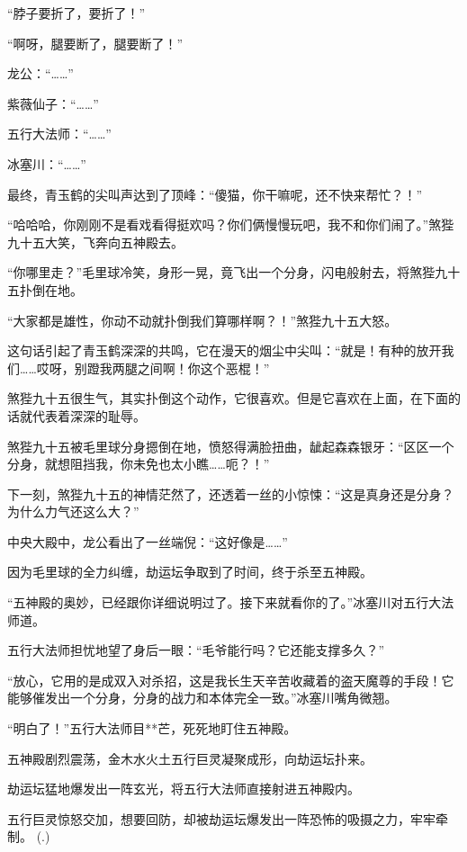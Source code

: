 \begin{this_body}
“脖子要折了，要折了！”

“啊呀，腿要断了，腿要断了！”

龙公：“……”

紫薇仙子：“……”

五行大法师：“……”

冰塞川：“……”

最终，青玉鹤的尖叫声达到了顶峰：“傻猫，你干嘛呢，还不快来帮忙？！”

“哈哈哈，你刚刚不是看戏看得挺欢吗？你们俩慢慢玩吧，我不和你们闹了。”煞狴九十五大笑，飞奔向五神殿去。

“你哪里走？”毛里球冷笑，身形一晃，竟飞出一个分身，闪电般射去，将煞狴九十五扑倒在地。

“大家都是雄性，你动不动就扑倒我们算哪样啊？！”煞狴九十五大怒。

这句话引起了青玉鹤深深的共鸣，它在漫天的烟尘中尖叫：“就是！有种的放开我们……哎呀，别蹬我两腿之间啊！你这个恶棍！”

煞狴九十五很生气，其实扑倒这个动作，它很喜欢。但是它喜欢在上面，在下面的话就代表着深深的耻辱。

煞狴九十五被毛里球分身摁倒在地，愤怒得满脸扭曲，龇起森森银牙：“区区一个分身，就想阻挡我，你未免也太小瞧……呃？！”

下一刻，煞狴九十五的神情茫然了，还透着一丝的小惊悚：“这是真身还是分身？为什么力气还这么大？”

中央大殿中，龙公看出了一丝端倪：“这好像是……”

因为毛里球的全力纠缠，劫运坛争取到了时间，终于杀至五神殿。

“五神殿的奥妙，已经跟你详细说明过了。接下来就看你的了。”冰塞川对五行大法师道。

五行大法师担忧地望了身后一眼：“毛爷能行吗？它还能支撑多久？”

“放心，它用的是成双入对杀招，这是我长生天辛苦收藏着的盗天魔尊的手段！它能够催发出一个分身，分身的战力和本体完全一致。”冰塞川嘴角微翘。

“明白了！”五行大法师目**芒，死死地盯住五神殿。

五神殿剧烈震荡，金木水火土五行巨灵凝聚成形，向劫运坛扑来。

劫运坛猛地爆发出一阵玄光，将五行大法师直接射进五神殿内。

五行巨灵惊怒交加，想要回防，却被劫运坛爆发出一阵恐怖的吸摄之力，牢牢牵制。	 (.)

\end{this_body}


